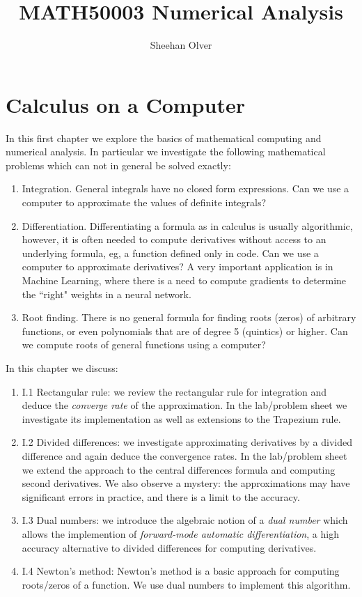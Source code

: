 \documentclass[12pt,a4paper]{book}
\title{ MATH50003 Numerical Analysis }
\author{ Sheehan Olver }
\theoremstyle{definition}
\begin{document}
\maketitle

\tableofcontents

\chapter{Calculus on a Computer}

In this first chapter we explore the basics of mathematical computing and numerical analysis.
In particular we investigate the following mathematical problems which can not in general be solved exactly:

\begin{enumerate}
\item Integration. General integrals have no closed form expressions. Can we use a computer to approximate the values of definite integrals?
\item Differentiation. Differentiating a formula as in calculus is usually algorithmic, however, it is often needed to compute derivatives without access to an underlying formula, eg,  a function defined only in code. Can we use a computer to approximate derivatives?  A very important application is in Machine Learning, where there is a need to compute gradients to determine the ``right" weights in a neural network. 
\item Root finding. There is no general formula for finding roots (zeros) of arbitrary functions, or even polynomials that are of degree 5 (quintics) or higher. Can we compute roots of general functions using a computer?
\end{enumerate}

In this chapter we discuss:

\begin{enumerate}
\item I.1 Rectangular rule: we review the rectangular rule for integration and deduce the {\it converge rate} of the approximation. In the lab/problem sheet  we investigate its implementation as well as extensions to the Trapezium rule. 
\item I.2 Divided differences: we investigate approximating derivatives by a divided difference and again deduce the convergence rates. In the lab/problem sheet we extend the approach to the central differences formula and computing second derivatives. We also observe a mystery: the approximations may have significant errors in practice, and there is a limit to the accuracy.
\item I.3 Dual numbers: we introduce the algebraic notion of a {\it dual number} which allows the implemention of {\it forward-mode automatic differentiation}, a high accuracy alternative to divided differences for computing derivatives.
\item I.4 Newton's method: Newton's method is a basic approach for computing roots/zeros of a function. We use dual numbers to implement this algorithm.
\end{enumerate}
\end{document}
